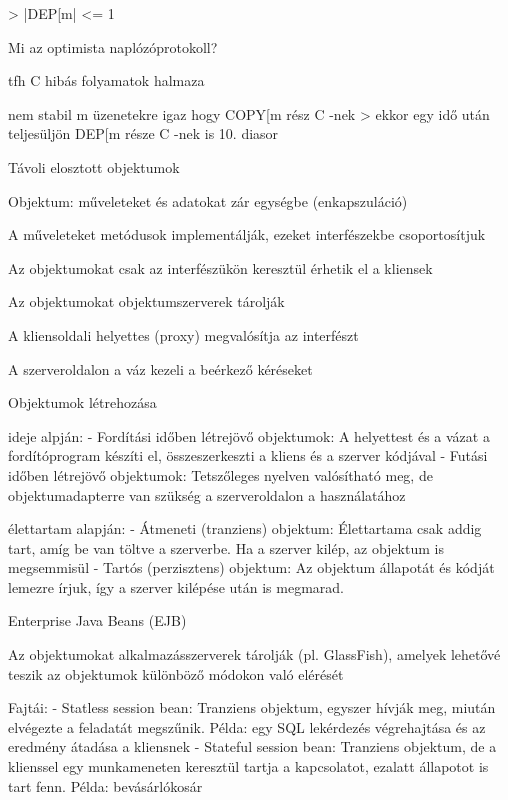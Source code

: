 \documentclass[12pt]{article}
\begin{document}
\begin{description}[style=unboxed]
        > |DEP[m| <= 1
    \item  Mi az optimista naplózóprotokoll?
    \item tfh C hibás folyamatok halmaza
    \item nem stabil m üzenetekre igaz hogy COPY[m rész C -nek
        > ekkor egy idő után teljesüljön DEP[m része C -nek  is 
        10. diasor
    \item  Távoli elosztott objektumok
    \item Objektum: műveleteket és adatokat zár egységbe (enkapszuláció)
    \item A műveleteket metódusok implementálják, ezeket interfészekbe csoportosítjuk
    \item Az objektumokat csak az interfészükön keresztül érhetik el a kliensek
    \item Az objektumokat objektumszerverek tárolják
    \item A kliensoldali helyettes (proxy) megvalósítja az interfészt
    \item A szerveroldalon a váz kezeli a beérkező kéréseket
    \item  Objektumok létrehozása
    \item ideje alpján:
        - Fordítási időben létrejövő objektumok: A helyettest és a vázat a fordítóprogram készíti el,
        összeszerkeszti a kliens és a szerver kódjával
        - Futási időben létrejövő objektumok: Tetszőleges nyelven valósítható meg, de objektumadapterre van
        szükség a szerveroldalon a használatához
    \item élettartam alapján:
        - Átmeneti (tranziens) objektum: Élettartama csak addig tart, amíg be van töltve a szerverbe. 
        Ha a szerver kilép, az objektum is megsemmisül
        - Tartós (perzisztens) objektum: Az objektum állapotát és kódját lemezre írjuk, így a szerver kilépése után
        is megmarad.
    \item  Enterprise Java Beans (EJB)
    \item Az objektumokat alkalmazásszerverek tárolják (pl. GlassFish), amelyek lehetővé teszik az objektumok
        különböző módokon való elérését
    \item Fajtái:
        - Statless session bean: Tranziens objektum, egyszer hívják meg, miután elvégezte a feladatát megszűnik.
        Példa: egy SQL lekérdezés végrehajtása és az eredmény átadása a kliensnek
        - Stateful session bean: Tranziens objektum, de a klienssel egy munkameneten keresztül tartja a kapcsolatot,
        ezalatt állapotot is tart fenn. Példa: bevásárlókosár

\end{description}
\end{document}
